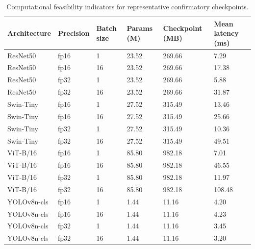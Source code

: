 \begin{table}
\caption{Computational feasibility indicators for representative confirmatory checkpoints.}
\label{tab:computational-feasibility}
\begin{tabular}{llllll}
\toprule
Architecture & Precision & Batch size & Params (M) & Checkpoint (MB) & Mean latency (ms) \\
\midrule
ResNet50 & fp16 & 1 & 23.52 & 269.66 & 7.29 \\
ResNet50 & fp16 & 16 & 23.52 & 269.66 & 17.38 \\
ResNet50 & fp32 & 1 & 23.52 & 269.66 & 5.88 \\
ResNet50 & fp32 & 16 & 23.52 & 269.66 & 31.87 \\
Swin-Tiny & fp16 & 1 & 27.52 & 315.49 & 13.46 \\
Swin-Tiny & fp16 & 16 & 27.52 & 315.49 & 25.66 \\
Swin-Tiny & fp32 & 1 & 27.52 & 315.49 & 10.36 \\
Swin-Tiny & fp32 & 16 & 27.52 & 315.49 & 49.51 \\
ViT-B/16 & fp16 & 1 & 85.80 & 982.18 & 7.01 \\
ViT-B/16 & fp16 & 16 & 85.80 & 982.18 & 46.55 \\
ViT-B/16 & fp32 & 1 & 85.80 & 982.18 & 11.97 \\
ViT-B/16 & fp32 & 16 & 85.80 & 982.18 & 108.48 \\
YOLOv8n-cls & fp16 & 1 & 1.44 & 11.16 & 4.20 \\
YOLOv8n-cls & fp16 & 16 & 1.44 & 11.16 & 4.23 \\
YOLOv8n-cls & fp32 & 1 & 1.44 & 11.16 & 3.45 \\
YOLOv8n-cls & fp32 & 16 & 1.44 & 11.16 & 3.20 \\
\bottomrule
\end{tabular}
\end{table}
